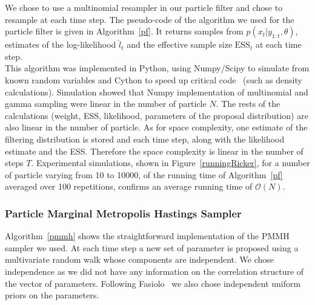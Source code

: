 \documentclass[12pt]{article}
\begin{document}
	We chose to use a multinomial resampler in our particle filter and chose to resample at each time step. The pseudo-code of the algorithm we used for the particle filter is given in Algorithm~\ref{pf}. It returns samples from $p(x_t | y_{1:t}, \theta)$, estimates of the log-likelihood $\hat{l}_t$ and the effective sample size $\mathrm{ESS}_t$ at each time step. \\
	This algorithm was implemented in Python, using Numpy/Scipy to simulate from known random variables and Cython to speed up critical code~\cite{wilbers2009using, behnel2011cython} (such as density calculations). Simulation showed that Numpy implementation of multinomial and gamma sampling were linear in the number of particle $N$. The rests of the calculations (weight, ESS, likelihood, parameters of the proposal distribution) are also linear in the number of particle. As for space complexity, one estimate of the filtering distribution is stored and each time step, along with the likelihood estimate and the ESS. Therefore the space complexity is linear in the number of steps $T$. Experimental simulations, shown in Figure~\ref{runningRicker}, for a number of particle varying from 10 to 10000, of the running time of Algorithm~\ref{pf} averaged over 100 repetitions, confirms an average running time of $\mathcal{O}(N)$.
	
	\subsubsection{Particle Marginal Metropolis Hastings Sampler}
	Algorithm~\ref{pmmh} shows the straightforward implementation of the PMMH sampler we used. At each time step a new set of parameter is proposed using a multivariate random walk whose components are independent. We chose independence as we did not have any information on the correlation structure of the vector of parameters. Following Fasiolo~\cite{fasiolo2014statistical} we also chose independent uniform priors on the parameters. \\
	
\end{document}
